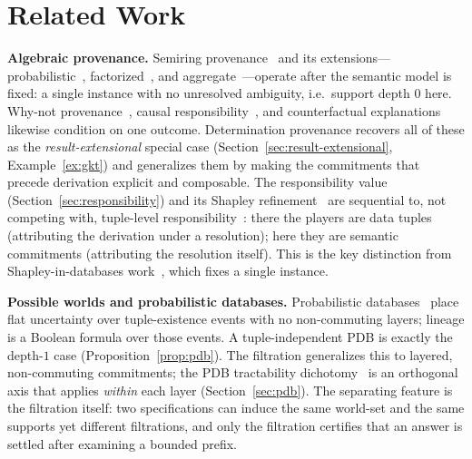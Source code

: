 \section{Related Work}
\label{sec:related}

\noindent\textbf{Algebraic provenance.}
Semiring provenance~\cite{green2007provenance} and its extensions---%
probabilistic~\cite{suciu2011probabilistic},
factorized~\cite{olteanu2015factorized}, and
aggregate~\cite{senellart2018provenance}---operate after the semantic model
is fixed: a single instance with no unresolved ambiguity, i.e.\ support depth
$0$ here. Why-not provenance~\cite{buneman2001why}, causal
responsibility~\cite{meliou2010causality}, and counterfactual
explanations~\cite{halpern2001causes} likewise condition on one outcome.
Determination provenance recovers all of these as the \emph{result-extensional}
special case (Section~\ref{sec:result-extensional}, Example~\ref{ex:gkt}) and
generalizes them by making the commitments that precede derivation explicit
and composable. The responsibility value
(Section~\ref{sec:responsibility}) and its Shapley
refinement~\cite{livshits2021shapley,shapley1953value} are sequential to, not
competing with, tuple-level responsibility~\cite{meliou2010causality}: there
the players are data tuples (attributing the derivation under a resolution);
here they are semantic commitments (attributing the resolution itself). This
is the key distinction from Shapley-in-databases
work~\cite{livshits2021shapley}, which fixes a single instance.

\smallskip
\noindent\textbf{Possible worlds and probabilistic databases.}
Probabilistic databases~\cite{suciu2011probabilistic} place flat uncertainty
over tuple-existence events with no non-commuting layers; lineage is a Boolean
formula over those events. A tuple-independent PDB is exactly the depth-$1$
case (Proposition~\ref{prop:pdb}). The filtration generalizes this to layered,
non-commuting commitments; the PDB tractability
dichotomy~\cite{dalvi2012probabilistic} is an orthogonal axis that applies
\emph{within} each layer (Section~\ref{sec:pdb}). The separating feature is
the filtration itself: two specifications can induce the same world-set and the
same supports yet different filtrations, and only the filtration certifies
that an answer is settled after examining a bounded prefix.

